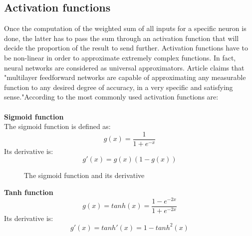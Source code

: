 \subsection{Activation functions}
\label{activation_functions}
Once the computation of the weighted sum of all inputs for a specific neuron is done, the latter has to pass the sum through an activation function that will decide the proportion of the result to send further. Activation functions have to be non-linear in order to approximate extremely complex functions. In fact, neural networks are considered as universal approximators. Article \cite{17} claims that "multilayer feedforward networks are capable of approximating any measurable function to any desired degree of accuracy, in a very specific and satisfying sense."According to \cite{18} the most commonly used activation functions are:\\\\
 \noindent \textbf{Sigmoid function}\\
 The sigmoid function is defined as:
 \begin{equation}
  g(x) = \frac{1}{1+e^{-x}}
 \end{equation}
 Its derivative is:
 \begin{equation}
 g'(x) = g(x)(1-g(x))
 \end{equation}
 


\begin{figure}[h!]
  \begin{center}
    \caption{The sigmoid function and its derivative}
  \end{center}
\end{figure} 
 
 
 \noindent \textbf{Tanh function}\\
 \begin{equation}
 g(x) = tanh(x) = \frac{1-e^{-2x}}{1+e^{-2x}}
 \end{equation}
 Its derivative is:
 \begin{equation}
 g'(x) = tanh'(x) = 1-tanh^{2}(x)
 \end{equation}
 
